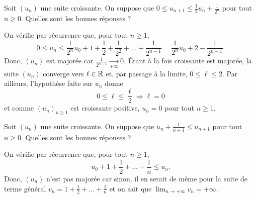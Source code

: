 \begin{question}
Soit $(u_n)$ une suite croissante. On suppose que $\displaystyle 0\leq u_{n+1}\leq \frac{1}{2}u_n+\frac{1}{2^n}$ pour tout $n\geq 0$. Quelles sont les bonnes réponses ?
\begin{answers} 
\end{answers}
\begin{explanations}
On vérifie par récurrence que, pour tout $n\geq 1$, 
$$\displaystyle 0\leq u_n\leq \frac{1}{2^n}u_0+1+\frac{1}{2}+\frac{1}{2^2}+\dots +\frac{1}{2^{n-1}}=\frac{1}{2^n}u_0+2-\frac{1}{2^{n-1}}.$$
Donc, $(u_n)$ est majorée car $\displaystyle \frac{1}{2^{n-1}}\underset{+\infty}{\longrightarrow}0$. \'Etant à la fois croissante est majorée, la suite $(u_n)$ converge vers $\ell \in \mathbb{R}$ et, par passage à la limite, $\displaystyle 0\leq \ell\leq 2$. Par ailleurs, l'hypothèse faite sur $u_n$ donne
$$0\leq \ell \leq \frac{\ell}{2} \Rightarrow \ell =0$$
et comme $(u_n)_{n\geq 1}$ est croissante positive, $u_n=0$ pour tout $n\geq 1$.
\end{explanations}
\end{question}



\begin{question}
Soit $(u_n)$ une suite croissante. On suppose que $\displaystyle u_n+\frac{1}{n+1}\leq u_{n+1}$ pour tout $n\geq 0$. Quelles sont les bonnes réponses ?
\begin{answers} 
\end{answers}
\begin{explanations}
On vérifie par récurrence que, pour tout $n\geq 1$, 
$$\displaystyle u_0+1+\frac{1}{2}+\dots +\frac{1}{n}\leq u_n.$$
Donc, $(u_n)$ n'est pas majorée car sinon, il en serait de même pour la suite de terme général $\displaystyle v_n=1+\frac{1}{2}+\dots +\frac{1}{n}$ et on sait que $\displaystyle \lim _{n\to +\infty}v_n=+\infty$.
\end{explanations}
\end{question}




